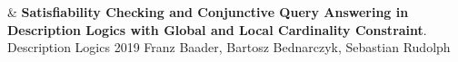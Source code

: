 \documentclass[10pt,a4paper]{article}
\begin{document}
\begin{EntriesTableYear}
  &
  \textbf{
Satisfiability Checking and Conjunctive Query Answering in Description Logics with Global and Local Cardinality Constraint}.
  \newline
  Description Logics 2019
  \newline
 Franz Baader, Bartosz Bednarczyk, Sebastian Rudolph
  \\
\end{EntriesTableYear}
\end{document}
